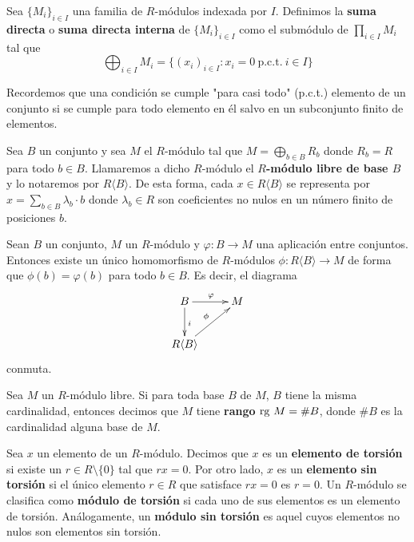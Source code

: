 \begin{definicion}
	Sea \(\{M_{i}\}_{i \in I}\) una familia de \(R\)-módulos indexada por \(I\).
	Definimos la \textbf{suma directa} o \textbf{suma directa interna} de
	\(\{M_{i}\}_{i \in I}\) como el submódulo de \(\prod_{i \in I}M_{i}\) tal que
	\[
	\bigoplus_{i \in I}M_{i}= \{(x_{i})_{i \in I}: x_{i}= 0 \ \text{p.c.t.}\ i \in
	I\}
	\]
\end{definicion}
\begin{nota}
	Recordemos que una condición se cumple "para casi todo" (p.c.t.) elemento de
	un conjunto si se cumple para todo elemento en él salvo en un subconjunto
	finito de elementos.
\end{nota}
\begin{definicion}
	Sea \(B\) un conjunto y sea \(M\) el \(R\)-módulo tal que \(M = \bigoplus_{b \in B}R_{b}\)
	donde \(R_{b}=R\) para todo \(b \in B\). Llamaremos a dicho \(R\)-módulo el \textbf{\(R\)-módulo
		libre de base \(B\)} y lo notaremos por \(R \langle B \rangle\). De esta forma, cada
	\(x \in R \langle B \rangle\) se representa por \(x = \sum_{b\in B}\lambda_{b}\cdot
	b\) donde \(\lambda_{b}\in R\) son coeficientes no nulos en un número finito de posiciones
	\(b\).
\end{definicion}

\begin{teorema}
	 \label{teo:univ-prop-free-mod} Sean
	\(B\) un conjunto, \(M\) un \(R\)-módulo y \(\varphi : B \to M\) una aplicación entre
	conjuntos. Entonces existe un único homomorfismo de \(R\)-módulos \(\phi : R \langle
	B \rangle \to M\) de forma que \(\phi(b) = \varphi(b)\) para todo \(b \in B\). Es
	decir, el diagrama
	\[
	\xymatrix{ B \ar@{->}[r]^{\varphi} \ar@{->}[d]^{i} & M \\ R \langle B \rangle \ar@{->}[ru]^{\phi} & }
	\]
	conmuta.
\end{teorema}

\begin{definicion}
	Sea \(M\) un \(R\)-módulo libre. Si para toda base \(B\) de \(M\), \(B\) tiene la misma cardinalidad,
	entonces decimos que \(M\) tiene \textbf{rango} \(\operatorname{rg} \, M = \# B\), donde \(\# B\)
	es la cardinalidad alguna base de \(M\).
\end{definicion}
\begin{definicion}
	Sea \(x\) un elemento de un \(R\)-módulo. Decimos que \(x\) es un\textbf{ elemento de
		torsión} si existe un \(r \in R \setminus \{0\}\) tal que \(rx = 0\). Por otro lado,
	\(x\) es un \textbf{elemento sin torsión} si el único elemento \(r \in R\) que satisface
	\(rx = 0\) es \(r = 0\). Un \(R\)-módulo se clasifica como \textbf{módulo de torsión}
	si cada uno de sus elementos es un elemento de torsión. Análogamente, un \textbf{módulo
		sin torsión} es aquel cuyos elementos no nulos son elementos sin torsión.
\end{definicion}

